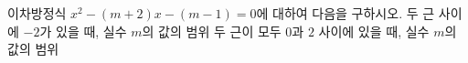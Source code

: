 이차방정식 $x^2-(m+2)x-(m-1)=0$에 대하여 다음을 구하시오.
 두 근 사이에 $-2$가 있을 때, 실수 $m$의 값의 범위
 두 근이 모두 $0$과 $2$ 사이에 있을 때, 실수 $m$의 값의 범위
